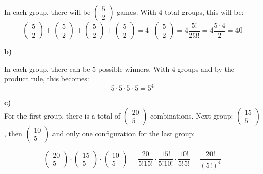 \documentclass[12pt]{article}
\begin{document}
In each group, there will be $\begin{pmatrix} 5 \\ 2 \end{pmatrix}$ games. With 4 total groups, this will be: \\
$$
\begin{pmatrix} 5 \\ 2 \end{pmatrix} + \begin{pmatrix} 5 \\ 2 \end{pmatrix} + \begin{pmatrix} 5 \\ 2 \end{pmatrix} + \begin{pmatrix} 5 \\ 2 \end{pmatrix}
= 4 \cdot \begin{pmatrix} 5 \\ 2 \end{pmatrix} = 4 \frac{5!}{2!3!}= 4 \frac{5\cdot 4}{2} = 40
$$

\textbf{b)}

In each group, there can be 5 possible winners. With 4 groups and by the product rule, this becomes: \\

$$
5 \cdot 5 \cdot 5 \cdot 5 = 5^4
$$

\textbf{c)} \\

For the first group, there is a total of $\begin{pmatrix} 20 \\ 5 \end{pmatrix}$ combinations. Next group: $\begin{pmatrix} 15 \\ 5 \end{pmatrix}$, then $\begin{pmatrix} 10 \\ 5 \end{pmatrix}$ and only one configuration for the last group:

$$
\begin{pmatrix} 20 \\ 5 \end{pmatrix} \cdot \begin{pmatrix} 15 \\ 5 \end{pmatrix} \cdot \begin{pmatrix} 10 \\ 5 \end{pmatrix}
= \frac{20}{5!15!} \cdot \frac{15!}{5!10!} \cdot \frac{10!}{5!5!} = \frac{20!}{(5!)^4}
$$
\end{document}
